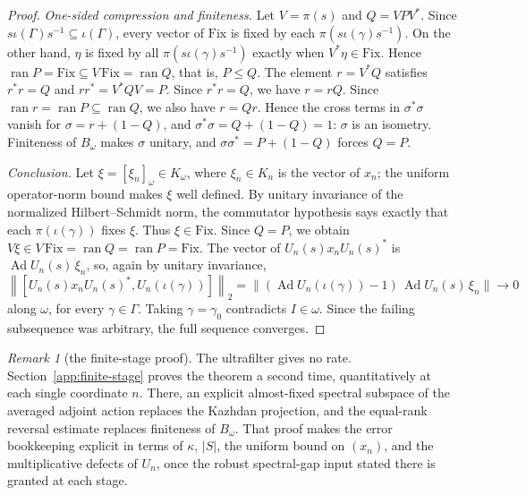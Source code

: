\documentclass[11pt]{amsart}
\theoremstyle{definition}
\theoremstyle{remark}
\newtheorem{remark}[theorem]{Remark}
\theoremstyle{plain}
\newcommand{\Ad}{\operatorname{Ad}}
\newcommand{\hsnorm}[1]{\left\lVert #1\right\rVert_{2}}
\begin{document}
\begin{proof}
\emph{One-sided compression and finiteness.}  Let $V=\pi(s)$ and
$Q=VPV^*$.  Since $s\iota(\Gamma)s^{-1}\subseteq\iota(\Gamma)$, every
vector of $\mathrm{Fix}$ is fixed by each
$\pi(s\iota(\gamma)s^{-1})$.  On the other hand, $\eta$ is fixed by
all $\pi(s\iota(\gamma)s^{-1})$ exactly when
$V^*\eta\in\mathrm{Fix}$.  Hence
$\operatorname{ran}P=\mathrm{Fix}\subseteq V\,\mathrm{Fix}
=\operatorname{ran}Q$, that is, $P\le Q$.
The element $r=V^*Q$ satisfies $r^*r=Q$ and $rr^*=V^*QV=P$.  Since
$r^*r=Q$, we have $r=rQ$.  Since
$\operatorname{ran}r=\operatorname{ran}P\subseteq\operatorname{ran}Q$,
we also have $r=Qr$.  Hence the cross terms in $\sigma^*\sigma$ vanish
for $\sigma=r+(1-Q)$, and $\sigma^*\sigma=Q+(1-Q)=1$: $\sigma$ is an
isometry.  Finiteness of $B_\omega$ makes
$\sigma$ unitary, and $\sigma\sigma^*=P+(1-Q)$ forces $Q=P$.

\emph{Conclusion.}  Let $\xi=[\xi_n]_\omega\in K_\omega$, where
$\xi_n\in K_n$ is the vector of $x_n$; the uniform operator-norm bound
makes $\xi$ well defined.  By unitary invariance of the normalized
Hilbert--Schmidt norm, the commutator hypothesis says exactly that each
$\pi(\iota(\gamma))$ fixes $\xi$.  Thus $\xi\in\mathrm{Fix}$.  Since $Q=P$, we obtain
$V\xi\in V\,\mathrm{Fix}=\operatorname{ran}Q=\operatorname{ran}P
=\mathrm{Fix}$.
The vector of $U_n(s)x_nU_n(s)^*$ is $\Ad U_n(s)\,\xi_n$, so, again by
unitary invariance,
\[
 \hsnorm{[U_n(s)x_nU_n(s)^*,U_n(\iota(\gamma))]}
 =\bigl\lVert(\Ad U_n(\iota(\gamma))-1)\,\Ad U_n(s)\,\xi_n\bigr\rVert
 \longrightarrow0
\]
along $\omega$, for every $\gamma\in\Gamma$.  Taking $\gamma=\gamma_0$
contradicts $I\in\omega$.  Since the failing subsequence was
arbitrary, the full sequence converges.
\end{proof}

\begin{remark}[the finite-stage proof]\label{rem:finite-stage}
The ultrafilter gives no rate.  Section~\ref{app:finite-stage}
proves the theorem a second time, quantitatively at each single
coordinate $n$.  There, an explicit almost-fixed spectral subspace of
the averaged adjoint action replaces the Kazhdan projection, and the
equal-rank reversal estimate replaces finiteness of $B_\omega$.  That
proof makes the error bookkeeping explicit in terms of $\kappa$,
$|S|$, the uniform bound on $(x_n)$, and the multiplicative defects of
$U_n$, once the robust spectral-gap input stated there is granted at
each stage.
\end{remark}
\end{document}
